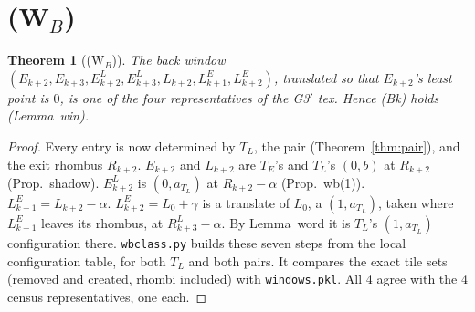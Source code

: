 \documentclass[11pt]{article}
\newtheorem{theorem}{Theorem}\newtheorem{lemma}[theorem]{Lemma}\newtheorem{proposition}[theorem]{Proposition}
\theoremstyle{remark}\newtheorem{remark}[theorem]{Remark}
\begin{document}
\section{(W$_B$)}
\begin{theorem}[(W$_B$)]\label{thm:wb}
The back window $(E_{k+2},E_{k+3},E^L_{k+2},E^L_{k+3},L_{k+2},L^E_{k+1},L^E_{k+2})$, translated so that $E_{k+2}$'s least point is $0$, is one of the four representatives of the G3$'$ tex. Hence (Bk) holds (Lemma~win).
\end{theorem}
\begin{proof}
Every entry is now determined by $T_L$, the pair (Theorem~\ref{thm:pair}), and the exit rhombus $R_{k+2}$. $E_{k+2}$ and $L_{k+2}$ are $T_E$'s and $T_L$'s $(0,b)$ at $R_{k+2}$ (Prop.~shadow). $E^L_{k+2}$ is $(0,a_{T_L})$ at $R_{k+2}-\alpha$ (Prop.~wb(1)). $L^E_{k+1}=L_{k+2}-\alpha$. $L^E_{k+2}=L_0+\gamma$ is a translate of $L_0$, a $(1,a_{T_L})$, taken where $L^E_{k+1}$ leaves its rhombus, at $R^L_{k+3}-\alpha$. By Lemma~word it is $T_L$'s $(1,a_{T_L})$ configuration there. \texttt{wbclass.py} builds these seven steps from the local configuration table, for both $T_L$ and both pairs. It compares the exact tile sets (removed and created, rhombi included) with \texttt{windows.pkl}. All 4 agree with the 4 census representatives, one each.
\end{proof}
\end{document}

